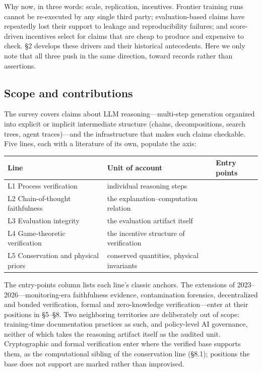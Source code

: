 \documentclass[11pt,a4paper]{article}
\begin{document}
Why now, in three words: scale, replication, incentives. Frontier training runs cannot be re-executed by any single third party; evaluation-based claims have repeatedly lost their support to leakage and reproducibility failures; and score-driven incentives select for claims that are cheap to produce and expensive to check. §2 develops these drivers and their historical antecedents. Here we only note that all three push in the same direction, toward records rather than assertions.

\subsection{Scope and contributions}

The survey covers claims about LLM reasoning—multi-step generation organized into explicit or implicit intermediate structure (chains, decompositions, search trees, agent traces)—and the infrastructure that makes such claims checkable. Five lines, each with a literature of its own, populate the axis:

\begin{table}[htbp]
\centering
\small
\setlength{\tabcolsep}{3.5pt}
\renewcommand{\arraystretch}{1.18}
\begin{tabularx}{0.985\textwidth}{>{\raggedright\arraybackslash}p{} >{\raggedright\arraybackslash}X >{\raggedright\arraybackslash}p{}}
\toprule
\textbf{Line} & \textbf{Unit of account} & \textbf{Entry points} \\
\midrule
L1 Process verification & individual reasoning steps & \cite{key05,key06} \\
L2 Chain-of-thought faithfulness & the explanation–computation relation & \cite{key02,key03} \\
L3 Evaluation integrity & the evaluation artifact itself & \cite{key07,key08} \\
L4 Game-theoretic verification & the incentive structure of verification & \cite{key09,key10} \\
L5 Conservation and physical priors & conserved quantities, physical invariants & \cite{key11,key12,key13} \\
\bottomrule
\end{tabularx}
\end{table}

The entry-points column lists each line's classic anchors. The extensions of 2023–2026—monitoring-era faithfulness evidence, contamination forensics, decentralized and bonded verification, formal and zero-knowledge verification—enter at their positions in §5–§8. Two neighboring territories are deliberately out of scope: training-time documentation practices as such, and policy-level AI governance, neither of which takes the reasoning artifact itself as the audited unit. Cryptographic and formal verification enter where the verified base supports them, as the computational sibling of the conservation line (§8.1); positions the base does not support are marked rather than improvised.
\end{document}
